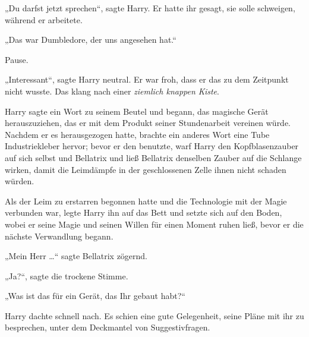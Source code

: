 „Du darfst jetzt sprechen“, sagte Harry. Er hatte ihr gesagt, sie solle schweigen, während er arbeitete.

„Das war Dumbledore, der uns angesehen hat.“

Pause.

„Interessant“, sagte Harry neutral. Er war froh, dass er das zu dem Zeitpunkt nicht wusste. Das klang nach einer \emph{ziemlich knappen Kiste}.

Harry sagte ein Wort zu seinem Beutel und begann, das magische Gerät herauszuziehen, das er mit dem Produkt seiner Stundenarbeit vereinen würde. Nachdem er es herausgezogen hatte, brachte ein anderes Wort eine Tube Industriekleber hervor; bevor er den benutzte, warf Harry den Kopfblasenzauber auf sich selbst und Bellatrix und ließ Bellatrix denselben Zauber auf die Schlange wirken, damit die Leimdämpfe in der geschlossenen Zelle ihnen nicht schaden würden.

Als der Leim zu erstarren begonnen hatte und die Technologie mit der Magie verbunden war, legte Harry ihn auf das Bett und setzte sich auf den Boden, wobei er seine Magie und seinen Willen für einen Moment ruhen ließ, bevor er die nächste Verwandlung begann.

„Mein Herr …“ sagte Bellatrix zögernd.

„Ja?“, sagte die trockene Stimme.

„Was ist das für ein Gerät, das Ihr gebaut habt?“

Harry dachte schnell nach. Es schien eine gute Gelegenheit, seine Pläne mit ihr zu besprechen, unter dem Deckmantel von Suggestivfragen.

